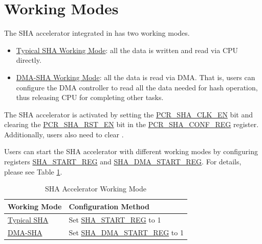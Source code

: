 \documentclass[main\_\_EN.tex]{subfiles}
\begin{document}
\section{Working Modes}
The SHA accelerator integrated in \chipname{} has two working modes.

\begin{itemize}
    \item \hyperref[sec:sha-typical-sha]{Typical SHA Working Mode}: all the data is written and read via CPU directly.
    \item \hyperref[sec:sha-dma-sha]{DMA-SHA Working Mode}: all the data is read via DMA. That is, users can configure the DMA controller to read all the data needed for hash operation, thus releasing CPU for completing other tasks.
\end{itemize}

The SHA accelerator is activated by setting the \hyperref[fielddesc:PCRSHACLKEN]{PCR\_SHA\_CLK\_EN} bit and clearing the \hyperref[fielddesc:PCRSHARSTEN]{PCR\_SHA\_RST\_EN} bit in the \hyperref[regdesc:PCRSHACONFREG]{PCR\_SHA\_CONF\_REG} register. Additionally, users also need to clear .

Users can start the SHA accelerator with different working modes by configuring registers \hyperref[regdesc:SHASTARTREG]{SHA\_START\_REG} and \hyperref[regdesc:SHADMASTARTREG]{SHA\_DMA\_START\_REG}. For details, please see Table \ref{tab:sha-hash-algo-select}.

\begin{longtable}[c]{ | l | l | }
\caption{SHA Accelerator Working Mode}
\label{tab:sha-hash-algo-select}
\\\hline
\rowcolor{lightgray}
\textbf{Working Mode}      & \textbf{Configuration Method}\\
    \hline
    \hyperref[sec:sha-typical-sha]{Typical SHA}      &  Set \hyperref[regdesc:SHASTARTREG]{SHA\_START\_REG} to 1   \\
    \hline
    \hyperref[sec:sha-dma-sha]{DMA-SHA}           &  Set \hyperref[regdesc:SHADMASTARTREG]{SHA\_DMA\_START\_REG} to 1   \\
    \hline
\end{longtable}
\end{document}
